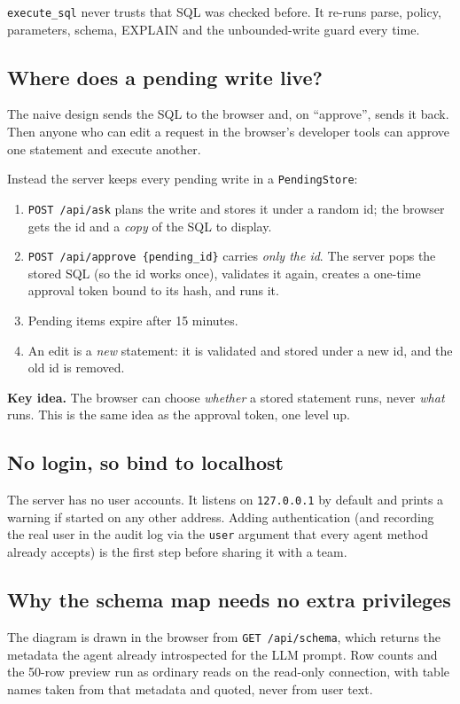 \documentclass[11pt,a4paper]{article}
\newcommand{\keyidea}[1]{%
  \par\smallskip\noindent\colorbox{notebg}{\parbox{\dimexpr\linewidth-2\fboxsep}{\small\textbf{Key idea.} #1}}\par\smallskip}
\begin{document}
\texttt{execute\_sql} never trusts that SQL was checked before. It re-runs
parse, policy, parameters, schema, EXPLAIN and the unbounded-write guard
every time.

\subsection*{Where does a pending write live?}
The naive design sends the SQL to the browser and, on ``approve'', sends it
back. Then anyone who can edit a request in the browser's developer tools can
approve one statement and execute another.

Instead the server keeps every pending write in a \texttt{PendingStore}:

\begin{enumerate}[leftmargin=*]
  \item \texttt{POST /api/ask} plans the write and stores it under a random id;
        the browser gets the id and a \emph{copy} of the SQL to display.
  \item \texttt{POST /api/approve \{pending\_id\}} carries \emph{only the id}.
        The server pops the stored SQL (so the id works once), validates it
        again, creates a one-time approval token bound to its hash, and runs it.
  \item Pending items expire after 15 minutes.
  \item An edit is a \emph{new} statement: it is validated and stored under a
        new id, and the old id is removed.
\end{enumerate}

\keyidea{The browser can choose \emph{whether} a stored statement runs, never
\emph{what} runs. This is the same idea as the approval token, one level up.}

\subsection*{No login, so bind to localhost}
The server has no user accounts. It listens on \texttt{127.0.0.1} by default
and prints a warning if started on any other address. Adding authentication
(and recording the real user in the audit log via the \texttt{user}
argument that every agent method already accepts) is the first step before
sharing it with a team.

\subsection*{Why the schema map needs no extra privileges}
The diagram is drawn in the browser from \texttt{GET /api/schema}, which
returns the metadata the agent already introspected for the LLM prompt.
Row counts and the 50-row preview run as ordinary reads on the read-only
connection, with table names taken from that metadata and quoted, never from
user text.
\end{document}
